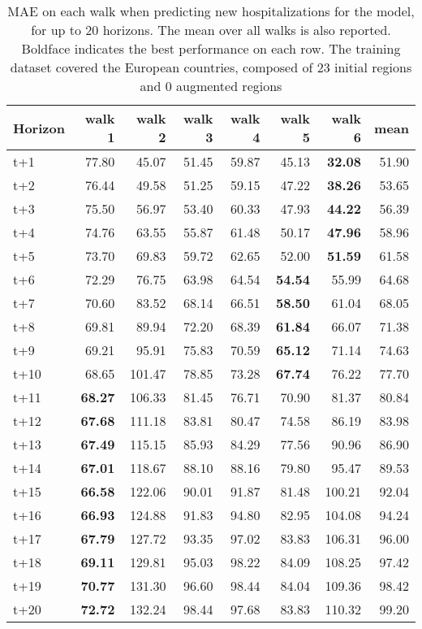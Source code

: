 \begin{table}[H]
\centering
\caption{MAE on each walk when predicting new hospitalizations for the model, for up to 20 horizons. The mean over all walks is also reported. Boldface indicates the best performance on each row. The training dataset covered the European countries, composed of 23 initial regions and 0 augmented regions }
\label{tab:MAE_walk_encoder_decoder}
\begin{tabular}{lrrrrrrr}
\toprule
Horizon &  walk 1 &  walk 2 &  walk 3 &  walk 4 &  walk 5 &  walk 6 &  mean \\
\midrule
t+1  & 77.80  & 45.07  & 51.45  & 59.87  & 45.13  & \textbf{32.08}  & 51.90  \\
t+2  & 76.44  & 49.58  & 51.25  & 59.15  & 47.22  & \textbf{38.26}  & 53.65  \\
t+3  & 75.50  & 56.97  & 53.40  & 60.33  & 47.93  & \textbf{44.22}  & 56.39  \\
t+4  & 74.76  & 63.55  & 55.87  & 61.48  & 50.17  & \textbf{47.96}  & 58.96  \\
t+5  & 73.70  & 69.83  & 59.72  & 62.65  & 52.00  & \textbf{51.59}  & 61.58  \\
t+6  & 72.29  & 76.75  & 63.98  & 64.54  & \textbf{54.54}  & 55.99  & 64.68  \\
t+7  & 70.60  & 83.52  & 68.14  & 66.51  & \textbf{58.50}  & 61.04  & 68.05  \\
t+8  & 69.81  & 89.94  & 72.20  & 68.39  & \textbf{61.84}  & 66.07  & 71.38  \\
t+9  & 69.21  & 95.91  & 75.83  & 70.59  & \textbf{65.12}  & 71.14  & 74.63  \\
t+10  & 68.65  & 101.47  & 78.85  & 73.28  & \textbf{67.74}  & 76.22  & 77.70  \\
t+11  & \textbf{68.27}  & 106.33  & 81.45  & 76.71  & 70.90  & 81.37  & 80.84  \\
t+12  & \textbf{67.68}  & 111.18  & 83.81  & 80.47  & 74.58  & 86.19  & 83.98  \\
t+13  & \textbf{67.49}  & 115.15  & 85.93  & 84.29  & 77.56  & 90.96  & 86.90  \\
t+14  & \textbf{67.01}  & 118.67  & 88.10  & 88.16  & 79.80  & 95.47  & 89.53  \\
t+15  & \textbf{66.58}  & 122.06  & 90.01  & 91.87  & 81.48  & 100.21  & 92.04  \\
t+16  & \textbf{66.93}  & 124.88  & 91.83  & 94.80  & 82.95  & 104.08  & 94.24  \\
t+17  & \textbf{67.79}  & 127.72  & 93.35  & 97.02  & 83.83  & 106.31  & 96.00  \\
t+18  & \textbf{69.11}  & 129.81  & 95.03  & 98.22  & 84.09  & 108.25  & 97.42  \\
t+19  & \textbf{70.77}  & 131.30  & 96.60  & 98.44  & 84.04  & 109.36  & 98.42  \\
t+20  & \textbf{72.72}  & 132.24  & 98.44  & 97.68  & 83.83  & 110.32  & 99.20  \\

\bottomrule
\end{tabular}
\end{table}
